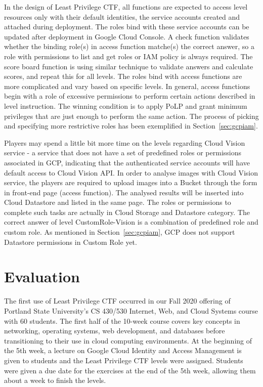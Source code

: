 \documentclass[a4paper,twoside]{article}
\begin{document}
In the design of Least Privilege CTF, all functions are expected to access level resources only with their default identities, the service accounts created and attached during deployment. The roles bind with these service accounts can be updated after deployment in Google Cloud Console. 
A check function validates whether the binding role(s) in access function matche(s) the correct answer, so a role with permissions to list and get roles or IAM policy is always required. The score board function is using similar technique to validate answers and calculate scores, and repeat this for all levels. The roles bind with access functions are more complicated and vary based on specific levels. In general, access functions begin with a role of excessive permissions to perform certain actions described in level instruction. The winning condition is to apply PoLP and grant minimum privileges that are just enough to perform the same action. The process of picking and specifying more restrictive roles has been exemplified in Section~\ref{sec:gcpiam}.

Players may spend a little bit more time on the levels regarding Cloud Vision service - a service that does not have a set of predefined roles or permissions associated in GCP, indicating that the authenticated service accounts will have default access to Cloud Vision API. In order to analyse images with Cloud Vision service, the players are required to upload images into a Bucket through the form in front-end page (access function). The analysed results will be inserted into Cloud Datastore and listed in the same page.  The roles or permissions to complete such tasks are actually in Cloud Storage and Datastore category. The correct answer of level CustomRole-Vision is a combination of predefined role and custom role. As mentioned in Section~\ref{sec:gcpiam}, GCP does not support Datastore permissions in Custom Role yet.
 

\section{Evaluation}
 \noindent The first use of Least Privilege CTF occurred in our Fall 2020 offering of Portland State University's CS 430/530 Internet, Web, and Cloud Systems course with 60 students.  The first half of the 10-week course covers key concepts in networking, operating systems, web development, and databases before transitioning to their use in cloud computing environments. At the beginning of the 5th week, a lecture on Google Cloud Identity and Access Management is given to students and the Least Privilege CTF levels were assigned. Students were given a due date for the exercises at the end of the 5th week, allowing them about a week to finish the levels.
\end{document}
